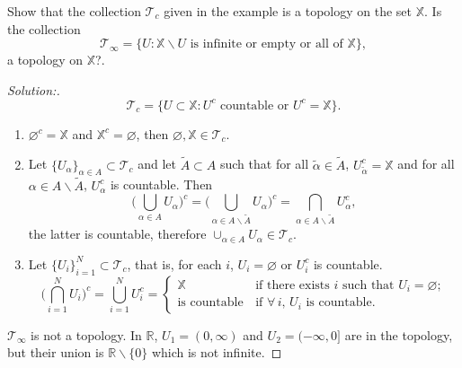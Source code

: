 \documentclass[a4paper,12pt, reqno]{article}
\theoremstyle{definition}
\newenvironment{exerr}[1]{
  \renewcommand\theexeralt{#1}
  \exeralt
}{\endexeralt}
\newenvironment{solution}{\begin{proof}[Solution:]}{\end{proof}}
\newcommand{\R}{\mathbb{R}}
\newcommand{\T}{\mathscr{T}}
\newcommand{\X}{\mathbb{X}}
\begin{document}
\begin{exerr}{3}
  Show that the collection $\T_{c}$ given in the example is a topology on the set $\X$. Is the collection
  \begin{equation*}
    \T_{\infty} = \{ U : \X\backslash U\text{ is infinite or empty or all of }\X \},
  \end{equation*}
  a topology on $\X$?.
\end{exerr}
\begin{solution}
  \begin{equation*}
    \T_{c} = \{ U\subset\X : U^c\text{ countable or }U^c=\X \}.
  \end{equation*}
  \begin{enumerate}
    \item $\varnothing^c = \X$ and $\X^c =\varnothing$, then $\varnothing,\X\in\T_{c}$.
    \item Let $\{ U_{\alpha} \}_{\alpha\in A}\subset\T_{c}$ and let $\widetilde{A}\subset A$ such that for all $\widetilde{\alpha}\in \widetilde{A}$, $U_{\widetilde{\alpha}}^c = \X$ and for all $\alpha\in A\backslash \widetilde{A}$, $U_{\alpha}^c$ is countable. Then
          \begin{equation*}
            \Big( \bigcup_{\alpha\in A}U_{\alpha} \Big)^c = \Big( \bigcup_{\alpha\in A\backslash \widetilde{A}}U_{\alpha} \Big)^c = \bigcap_{\alpha\in A\backslash \widetilde{A}}U_{\alpha}^c,
          \end{equation*}
          the latter is countable, therefore $\cup_{\alpha\in A}U_{\alpha}\in\T_{c}$.
    \item Let $\{ U_{i} \}_{i=1}^N\subset\T_{c}$, that is, for each $i$, $U_{i}=\varnothing$ or $U_{i}^c$ is countable.
          \begin{equation*}
            \Big( \bigcap_{i=1}^N U_{i} \Big)^c = \bigcup_{i=1}^N U_{i}^c = \begin{cases}
              \X\,                  & \text{if there exists $i$ such that }U_{i}=\varnothing; \\
              \text{is countable}\, & \text{if }\forall\,i,\,U_{i}\text{ is countable.}
            \end{cases}
          \end{equation*}
  \end{enumerate}
  $\T_{\infty}$ is not a topology. In $\R$, $U_{1} = (0,\infty)$ and $U_{2}=(-\infty,0]$ are in the topology, but their union is $\R\backslash\{ 0 \}$ which is not infinite.
\end{solution}
\end{document}
